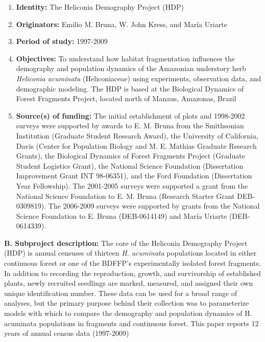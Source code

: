 \documentclass[
  english,
  man]{apa6}
\begin{document}
\begin{enumerate}
\def\labelenumi{\arabic{enumi}.}
\item
  \textbf{Identity:} The Heliconia Demography Project (HDP)
\item
  \textbf{Originators:} Emilio M. Bruna, W. John Kress, and María Uriarte
\item
  \textbf{Period of study:} 1997-2009
\item
  \textbf{Objectives:} To understand how habitat fragmentation influences
  the demography and population dynamics of the Amazonian understory
  herb \emph{Heliconia acuminata} (Heliconiaceae) using experiments,
  observation data, and demographic modeling. The HDP is based at the
  Biological Dynamics of Forest Fragments Project, located north of
  Manaus, Amazonas, Brazil
\item
  \textbf{Source(s) of funding:} The initial establishment of plots and
  1998-2002 surveys were supported by awards to E. M. Bruna from the
  Smithsonian Institution (Graduate Student Research Award), the
  University of California, Davis (Center for Population Biology
  and M. E. Mathias Graduate Research Grants), the Biological Dynamics
  of Forest Fragments Project (Graduate Student Logistics Grant), the
  National Science Foundation (Dissertation Improvement Grant INT
  98-06351), and the Ford Foundation (Dissertation Year Fellowship).
  The 2001-2005 surveys were supported a grant from the National
  Science Foundation to E. M. Bruna (Research Starter Grant
  DEB-0309819). The 2006-2009 surveys were supported by grants from
  the National Science Foundation to E. Bruna (DEB-0614149) and María
  Uriarte (DEB-0614339).
\end{enumerate}

\noindent  
\textbf{B. Subproject description:} The core of the Heliconia
Demography Project (HDP) is annual censuses of thirteen \emph{H. acuminata}
populations located in either continuous forest or one of the BDFFP's
experimentally isolated forest fragments. In addition to recording the
reproduction, growth, and survivorship of established plants, newly
recruited seedlings are marked, measured, and assigned their own unique
identification number. These data can be used for a broad range of
analyses, but the primary purpose behind their collection was to
parameterize models with which to compare the demography and population
dynamics of H. acuminata populations in fragments and continuous forest.
This paper reports 12 years of annual census data (1997-2009)
\end{document}
